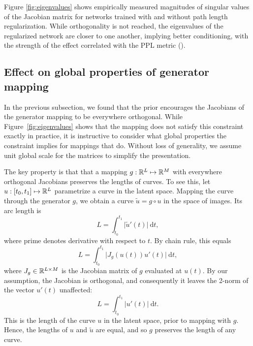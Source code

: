 \figeigenvalues

Figure \ref{fig:eigenvalues} shows empirically measured magnitudes of singular values of the Jacobian matrix for networks trained with and without path length regularization. While orthogonality is not reached, the eigenvalues of the regularized network are closer to one another, implying better conditioning, with the strength of the effect correlated with the PPL metric ().

\subsection{Effect on global properties of generator mapping}
In the previous subsection, we found that the prior encourages the Jacobians of the generator mapping to be everywhere orthogonal. While Figure~\ref{fig:eigenvalues} shows that the mapping does not satisfy this constraint exactly in practice, it is instructive to consider what global properties the constraint implies for mappings that do.  Without loss of generality, we assume unit global scale for the matrices to simplify the presentation.

The key property is that that a mapping $g: \mathbb{R}^L \mapsto \mathbb{R}^M$ with everywhere orthogonal Jacobians preserves the lengths of curves. To see this, let $u: [t_0, t_1] \mapsto \mathbb{R}^L$ parametrize a curve in the latent space. Mapping the curve through the generator $g$, we obtain a curve $\tilde u = g \circ u$ in the space of images. Its arc length is
\begin{equation}
	L = \int_{t_0}^{t_1} \lvert \tilde u'(t) \rvert ~\mathrm{d}t,
\end{equation}
where prime denotes derivative with respect to $t$. By chain rule, this equals
\begin{equation}
	L = \int_{t_0}^{t_1} \lvert J_g(u(t)) u'(t) \rvert ~\mathrm{d}t,
\end{equation}
where $J_g \in \mathbb{R}^{L \times M}$ is the Jacobian matrix of $g$ evaluated at $u(t)$. By our assumption, the Jacobian is orthogonal, and consequently it leaves the 2-norm of the vector $u'(t)$ unaffected:
\begin{equation}
	L = \int_{t_0}^{t_1} \lvert u'(t) \rvert ~\mathrm{d}t.
\end{equation}
This is the length of the curve $u$ in the latent space, prior to mapping with $g$. Hence, the lengths of $u$ and $\tilde u$ are equal, and so $g$ preserves the length of any curve.

